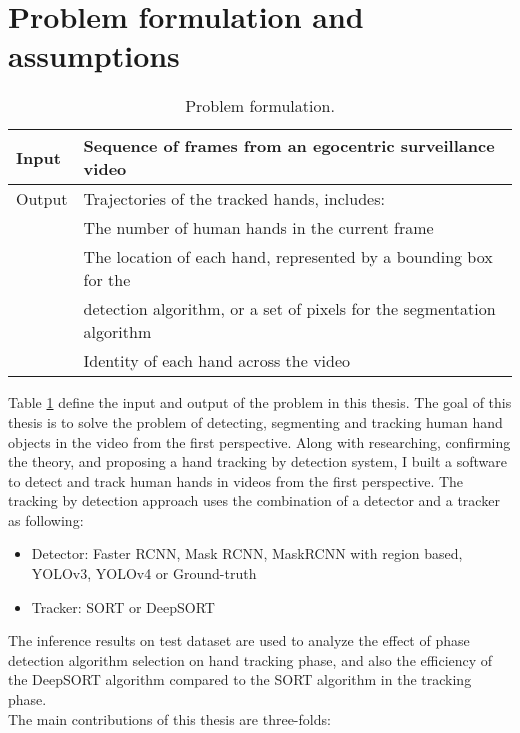 \section{Problem formulation and assumptions}
\begin{table}
	\caption{Problem formulation.}
	\label{formulation}
	\begin{tabular}{|l|l|}
		
		\hline 
		Input &  Sequence of frames from an egocentric surveillance video\\ 
		\hline 
		Output & Trajectories of the tracked hands, includes: \\
		& \tabitem The number of human hands in the current frame \\
		& \tabitem The location of each hand, represented by a bounding box for the \\ 
		& detection algorithm, or a set of pixels for the segmentation algorithm \\
		& \tabitem Identity of each hand across the video
\\ 
		\hline 
	\end{tabular} 
\end{table}
Table \ref{formulation} define the input and output of the problem in this thesis. The goal of this thesis is to solve the problem of detecting, segmenting and tracking human hand objects in the video from the first perspective. Along with researching, confirming the theory, and proposing a hand tracking by detection system, I built a software to detect and track human hands in videos from the first perspective. The tracking by detection approach uses the combination of a detector and a tracker as following:
\begin{itemize}
	\item Detector: Faster RCNN, Mask RCNN, MaskRCNN with region based, YOLOv3, YOLOv4 or Ground-truth
	\item Tracker: SORT or DeepSORT
\end{itemize}
The inference results on test dataset are used to analyze the effect of phase detection algorithm selection on hand tracking phase, and also the efficiency of the DeepSORT algorithm compared to the SORT algorithm in the tracking phase.
\\The main contributions of this thesis are three-folds:
